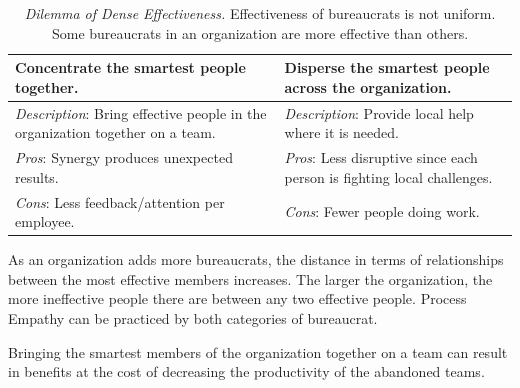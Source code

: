 \begin{center}
\begin{table}[H] %
\begin{tabular}{ | m{\dilemmatablewidth}| m{\dilemmatablewidth} | } 
  \hline
  \textbf{Concentrate the smartest people together.} &
  \textbf{Disperse the smartest people across the organization.} \\ 
  \hline
  \textit{Description}: Bring effective people in the organization together on a team. & 
  \textit{Description}: Provide local help where it is needed. \\ 
  \hline
  \textit{Pros}: Synergy produces unexpected results. & 
  \textit{Pros}: Less disruptive since each person is fighting local challenges. \\  
  \hline
  \textit{Cons}: Less feedback/attention per employee. & 
  \textit{Cons}: Fewer people doing work. \\  
  \hline
\end{tabular}
\caption{
\textit{Dilemma of Dense Effectiveness.}
Effectiveness of bureaucrats is not uniform. Some bureaucrats in an organization are more effective than others.
}
\label{table:dilemma-org-dense-effectiveness}
\end{table}
\end{center}


As an organization adds more bureaucrats, the distance in terms of relationships between the most effective members increases.
The larger the organization, the more ineffective people there are between any two effective people. Process Empathy can be practiced by both categories of bureaucrat. 

Bringing the smartest members of the organization together on a team can result in benefits at the cost of decreasing the productivity of the abandoned teams. 


